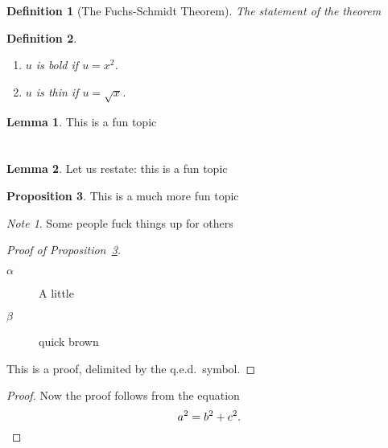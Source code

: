 \documentclass{amsart}
\newtheorem{definition}{Definition}
\theoremstyle{definition}
\newtheorem{lemma}{Lemma}[section]
\newtheorem{proposition}[lemma]{Proposition}
\theoremstyle{remark}
\newtheorem*{note}{Note}
\begin{document}
\begin{definition}[The Fuchs-Schmidt Theorem]
    The statement of the theorem
\end{definition}

\begin{definition}\label{D:prime}
    \hfill
    \begin{enumerate}
        \item $u$ is \emph{bold} if $u = x^2$.\label{mi1}
        \item $u$ is \emph{thin} if $u = \sqrt{x}$.\label{mi2}
    \end{enumerate}
\end{definition}

\begin{lemma}
    This is a fun topic
\end{lemma}

\section{}

\begin{lemma}
    Let us restate: this is a fun topic
\end{lemma}

\begin{proposition}\label{P:fun}
    This is a much more fun topic
\end{proposition}

\begin{note}
    Some people fuck things up for others
\end{note}

\begin{proof}[Proof of Proposition~\ref{P:fun}]
    \hfill
    \begin{description}
        \item[$\alpha$] A little
        \item[$\beta$] quick brown
    \end{description}

    This is a proof, delimited by the q.e.d.\ symbol.
\end{proof}

\begin{proof}
    Now the proof follows from the equation
    \[
        a^2 = b^2 + c^2.\qedhere
    \]
\end{proof}
\end{document}
